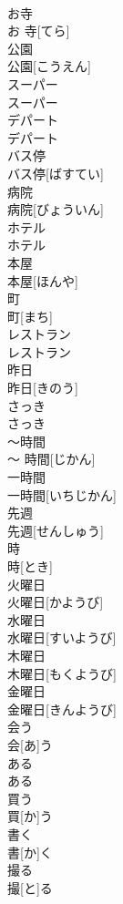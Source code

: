 \documentclass[8pt]{extreport}
\begin{document}
\begin{CJK}{UTF8}{min}
\\	お寺	
\\	お 寺[てら]
\\	公園	
\\	公園[こうえん]
\\	スーパー	
\\	スーパー
\\	デパート	
\\	デパート
\\	バス停	
\\	バス停[ばすてい]
\\	病院	
\\	病院[びょういん]
\\	ホテル	
\\	ホテル
\\	本屋	
\\	本屋[ほんや]
\\	町	
\\	町[まち]
\\	レストラン	
\\	レストラン
\\	昨日	
\\	昨日[きのう]
\\	さっき	
\\	さっき
\\	〜時間	
\\	〜 時間[じかん]
\\	一時間	
\\	一時間[いちじかん]
\\	先週	
\\	先週[せんしゅう]
\\	時	
\\	時[とき]
\\	火曜日	
\\	火曜日[かようび]
\\	水曜日	
\\	水曜日[すいようび]
\\	木曜日	
\\	木曜日[もくようび]
\\	金曜日	
\\	金曜日[きんようび]
\\	会う	
\\	会[あ]う
\\	ある	
\\	ある
\\	買う	
\\	買[か]う
\\	書く	
\\	書[か]く
\\	撮る	
\\	撮[と]る

\end{CJK}
\end{document}
